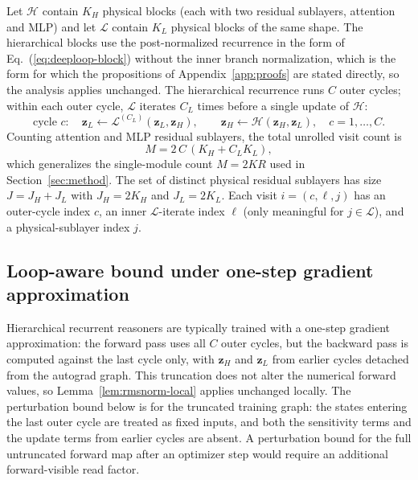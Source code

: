 \documentclass[11pt]{airesearch}
\begin{document}
Let $\mathcal{H}$ contain $K_H$ physical blocks (each with two residual
sublayers, attention and MLP) and let $\mathcal{L}$ contain $K_L$ physical
blocks of the same shape. The hierarchical blocks use the post-normalized
recurrence in the form of Eq.~(\ref{eq:deeploop-block}) without the inner
branch normalization, which is the form for which the propositions of
Appendix~\ref{app:proofs} are stated directly, so the analysis applies
unchanged.
The hierarchical recurrence runs $C$ outer cycles;
within each outer cycle, $\mathcal{L}$ iterates $C_L$ times before a single
update of $\mathcal{H}$:
\[
  \text{cycle } c:\quad
  \mathbf{z}_L \leftarrow \mathcal{L}^{(C_L)}(\mathbf{z}_L,\mathbf{z}_H),\qquad
  \mathbf{z}_H \leftarrow \mathcal{H}(\mathbf{z}_H,\mathbf{z}_L),
  \quad c=1,\ldots,C.
\]
Counting attention and MLP residual sublayers, the total unrolled visit count
is
\begin{equation}
  M
  = 2\,C\,(K_H + C_L K_L),
  \label{eq:hrm-forward-M}
\end{equation}
which generalizes the single-module count $M=2KR$ used in
Section~\ref{sec:method}. The set of distinct physical residual sublayers has
size $J = J_H + J_L$ with $J_H = 2K_H$ and $J_L = 2K_L$. Each visit
$i=(c,\ell,j)$ has an outer-cycle index $c$, an inner $\mathcal{L}$-iterate
index $\ell$ (only meaningful for $j\in\mathcal{L}$), and a physical-sublayer
index $j$.

\subsection{Loop-aware bound under one-step gradient approximation}
\label{sec:hrm:gradtrunc}

Hierarchical recurrent reasoners are typically trained with a one-step
gradient approximation: the forward pass uses all $C$ outer cycles, but the
backward pass is computed against the last cycle only, with $\mathbf{z}_H$
and $\mathbf{z}_L$ from earlier cycles detached from the autograd graph. This truncation does not alter the numerical forward values, so Lemma~\ref{lem:rmsnorm-local} applies unchanged locally. The perturbation bound below is for the truncated training graph: the states entering the last outer cycle are treated as fixed inputs, and both the sensitivity terms and the update terms from earlier cycles are absent. A perturbation bound for the full untruncated forward map after an optimizer step would require an additional forward-visible read factor.
\end{document}
